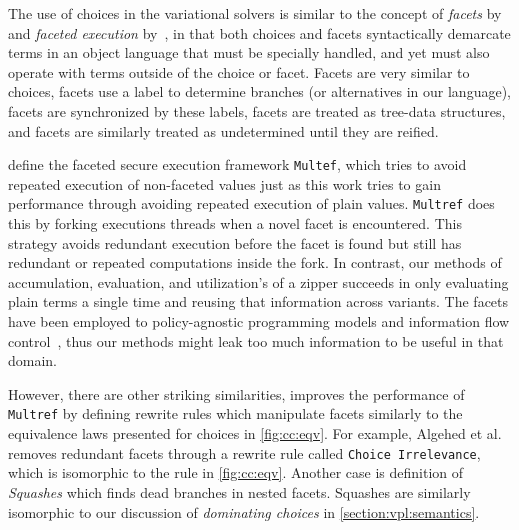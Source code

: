 The use of choices in the variational solvers is similar to the concept of
\textit{facets} by~\cite{austin2012multiple} and \textit{faceted execution}
by~\cite{Schmitz2018FacetedSM,Micinski2018AbstractingFE,10.1145/2465106.2465121},
in that both choices and facets syntactically demarcate terms in an object
language that must be specially handled, and yet must also operate with terms
outside of the choice or facet. Facets are very similar to choices, facets use a
label to determine branches (or alternatives in our language), facets are
synchronized by these labels, facets are treated as tree-data structures, and
facets are similarly treated as undetermined until they are reified.

\citet{10.1145/3243734.3243806} define the faceted secure execution framework
\texttt{Multef}, which tries to avoid repeated execution of non-faceted values
just as this work tries to gain performance through avoiding repeated execution
of plain values. \texttt{Multref} does this by forking executions threads when a
novel facet is encountered. This strategy avoids redundant execution before the
facet is found but still has redundant or repeated computations inside the fork.
In contrast, our methods of accumulation, evaluation, and utilization's of a
zipper succeeds in only evaluating plain terms a single time and reusing that
information across variants. The facets have been employed to policy-agnostic
programming models and information flow control~\cite{IFC}, thus our methods
might leak too much information to be useful in that domain.

However, there are other striking similarities, \citet{optimisingFacets}
improves the performance of \texttt{Multref} by defining rewrite rules which
manipulate facets similarly to the equivalence laws presented for choices in
\autoref{fig:cc:eqv}. For example, Algehed et al. removes redundant facets
through a rewrite rule called \texttt{Choice Irrelevance}, which is isomorphic
to the  rule in \autoref{fig:cc:eqv}. Another case is definition of
\emph{Squashes} which finds dead branches in nested facets. Squashes are
similarly isomorphic to our discussion of \emph{dominating choices} in
\autoref{section:vpl:semantics}.



